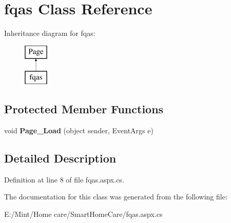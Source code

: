 \hypertarget{classfqas}{\section{fqas Class Reference}
\label{classfqas}
}
Inheritance diagram for fqas\-:\begin{figure}[H]
\begin{center}
\leavevmode
\includegraphics[height=2.000000cm]{classfqas}
\end{center}
\end{figure}
\subsection*{Protected Member Functions}
\begin{DoxyCompactItemize}
\item 
\hypertarget{classfqas_a3a30d3c05672631bcb1c14738086db45}{void {\bfseries Page\-\_\-\-Load} (object sender, Event\-Args e)}\label{classfqas_a3a30d3c05672631bcb1c14738086db45}

\end{DoxyCompactItemize}


\subsection{Detailed Description}


Definition at line 8 of file fqas.\-aspx.\-cs.



The documentation for this class was generated from the following file\-:\begin{DoxyCompactItemize}
\item 
E\-:/\-Mint/\-Home care/\-Smart\-Home\-Care/fqas.\-aspx.\-cs\end{DoxyCompactItemize}
